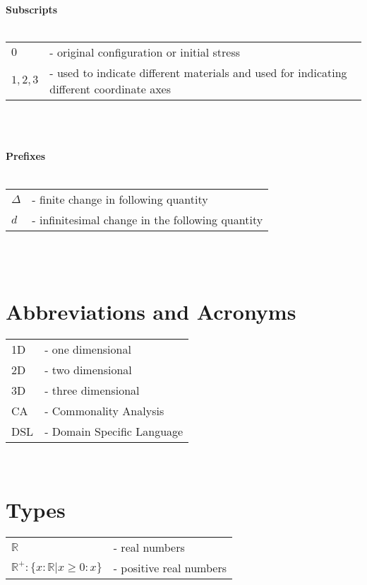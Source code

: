 \documentclass{article}
\newcommand{\blt}{- } %
\begin{document}
\noindent \textbf{Subscripts}\\
~\newline

\noindent
\begin{tabular}{l p{12cm}}
  $0$ & \blt original configuration or initial stress\\
  $1, 2, 3$ & \blt used to indicate different materials and used for indicating different coordinate axes\\
\end{tabular}\\
~\newline

\noindent \textbf{Prefixes}\\
~\newline

\noindent
\begin{tabular}{l l}
  $\Delta$ & \blt finite change in following quantity\\
  $d$ & \blt infinitesimal change in the following quantity\\
\end{tabular}\\
~\newline

\section*{Abbreviations and Acronyms}

\begin{tabular}{l l}
  1D & \blt one dimensional\\
  2D & \blt two dimensional\\
  3D & \blt three dimensional\\
  CA & \blt Commonality Analysis\\
  DSL & \blt Domain Specific Language\\
\end{tabular}\\

\newpage

\section*{Types}

\begin{tabular}{l p{8cm}}
  $\mathbb{R}$ & \blt real numbers\\
  $\mathbb{R}^{+}: \{ x: \mathbb{R} | x \geq 0 : x \}$ & \blt positive real numbers\\
\end{tabular}\\
\end{document}
